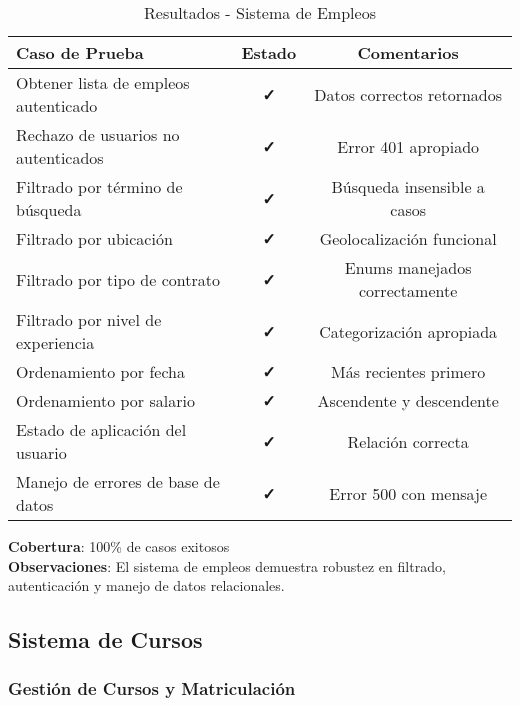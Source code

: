 \documentclass[12pt,a4paper]{article}
\begin{document}
\begin{table}[H]
\centering
\caption{Resultados - Sistema de Empleos}
\begin{tabular}{@{}p{6cm}cc@{}}
\toprule
\textbf{Caso de Prueba} & \textbf{Estado} & \textbf{Comentarios} \\
\midrule
Obtener lista de empleos autenticado & \textcolor{successgreen}{\textbf{✓}} & Datos correctos retornados \\
Rechazo de usuarios no autenticados & \textcolor{successgreen}{\textbf{✓}} & Error 401 apropiado \\
Filtrado por término de búsqueda & \textcolor{successgreen}{\textbf{✓}} & Búsqueda insensible a casos \\
Filtrado por ubicación & \textcolor{successgreen}{\textbf{✓}} & Geolocalización funcional \\
Filtrado por tipo de contrato & \textcolor{successgreen}{\textbf{✓}} & Enums manejados correctamente \\
Filtrado por nivel de experiencia & \textcolor{successgreen}{\textbf{✓}} & Categorización apropiada \\
Ordenamiento por fecha & \textcolor{successgreen}{\textbf{✓}} & Más recientes primero \\
Ordenamiento por salario & \textcolor{successgreen}{\textbf{✓}} & Ascendente y descendente \\
Estado de aplicación del usuario & \textcolor{successgreen}{\textbf{✓}} & Relación correcta \\
Manejo de errores de base de datos & \textcolor{successgreen}{\textbf{✓}} & Error 500 con mensaje \\
\bottomrule
\end{tabular}
\end{table}

\textbf{Cobertura}: 100\% de casos exitosos \\
\textbf{Observaciones}: El sistema de empleos demuestra robustez en filtrado, autenticación y manejo de datos relacionales.

\subsection{Sistema de Cursos}

\subsubsection{Gestión de Cursos y Matriculación}
\end{document}

